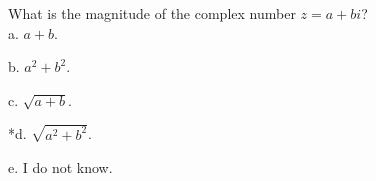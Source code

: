 
What is the magnitude of the complex number \(z = a+bi\)?\\

a. \(a+b\).

b. \(a^{2} + b^{2}\).

c. \(\sqrt{a+b}\).

*d. \(\sqrt{a^{2} + b^{2}}\).

e. I do not know.\\

